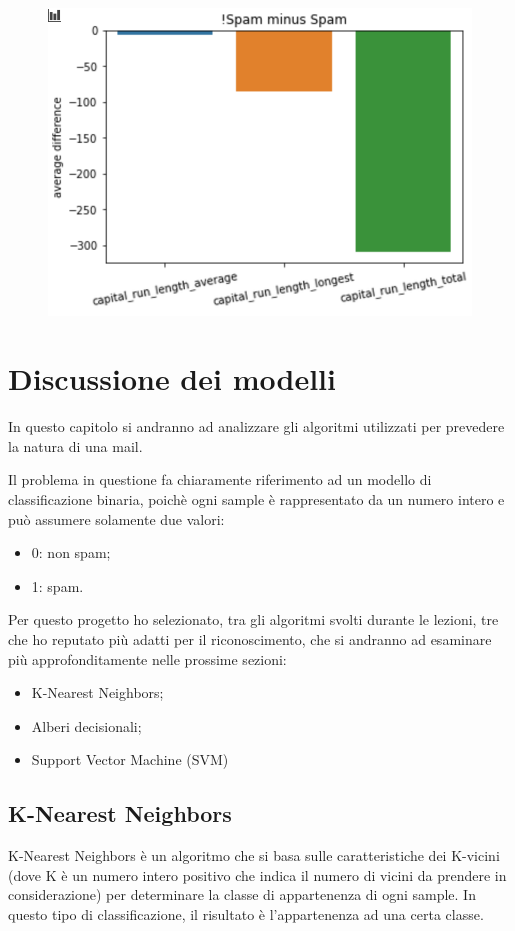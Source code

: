 \documentclass[12pt,a4paper]{article}
\begin{document}
\begin{figure}[H]
    \centering
    \includegraphics[width=.9\columnwidth]{capital_plot.png}
    \caption{}
\end{figure}
\clearpage
\section{Discussione dei modelli}
In questo capitolo si andranno ad analizzare gli algoritmi utilizzati per prevedere la  natura di una mail.

Il problema in questione fa chiaramente riferimento ad un modello di classificazione binaria, poichè ogni sample è rappresentato da un numero intero e può assumere solamente due valori:
\begin{itemize}
    \item 0: non spam;
    \item 1: spam.
\end{itemize}
Per questo progetto ho selezionato, tra gli algoritmi svolti durante le lezioni, tre che ho reputato più adatti per il riconoscimento, che si andranno ad esaminare più approfonditamente nelle prossime sezioni:
\begin{itemize}
    \item K-Nearest Neighbors;
    \item Alberi decisionali;
    \item Support Vector Machine (SVM)
\end{itemize}

\clearpage
\subsection{K-Nearest Neighbors}
K-Nearest Neighbors è un algoritmo che si basa sulle caratteristiche dei K-vicini (dove K è un numero intero positivo che indica il numero di vicini da prendere in considerazione) per determinare la classe di appartenenza di ogni sample.
In questo tipo di classificazione, il risultato è l'appartenenza ad una certa classe.
\end{document}
